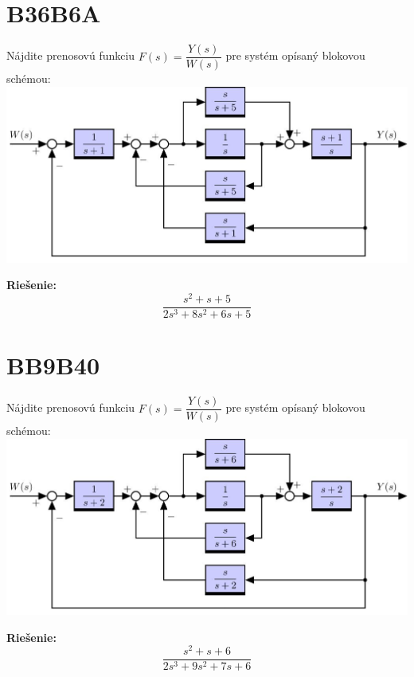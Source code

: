\documentclass[a4paper, 12pt]{article}
\newenvironment{task}{}{}
\newenvironment{solution}{\noindent\textbf{Riešenie:}}{}
\begin{document}
\section*{B36B6A}
\begin{task}
    Nájdite prenosovú funkciu $F(s)=\dfrac{Y(s)}{W(s)}$ pre systém opísaný blokovou schémou: \\ 

    \includegraphics{zadanie99/images/blokovka02_00002.jpg} 
\end{task} 

\begin{solution}
    \begin{equation*}
        \dfrac{s^2+s+5}{2s^3+8s^2+6s+5}
    \end{equation*}
\end{solution}

\section*{BB9B40}
\begin{task}
    Nájdite prenosovú funkciu $F(s)=\dfrac{Y(s)}{W(s)}$ pre systém opísaný blokovou schémou: \\ 

    \includegraphics{zadanie99/images/blokovka02_00003.jpg} 
\end{task} 

\begin{solution}
    \begin{equation*}
        \dfrac{s^2+s+6}{2s^3+9s^2+7s+6}
    \end{equation*}
\end{solution}
\end{document}
